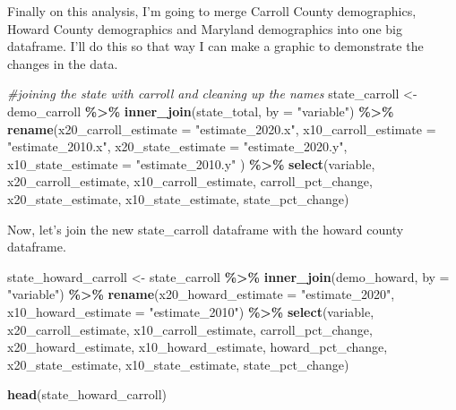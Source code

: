 \documentclass[
]{article}
\newenvironment{Shaded}{\begin{snugshade}}{\end{snugshade}}
\newcommand{\AttributeTok}[1]{\textcolor[rgb]{0.13,0.29,0.53}{#1}}
\newcommand{\CommentTok}[1]{\textcolor[rgb]{0.56,0.35,0.01}{\textit{#1}}}
\newcommand{\FunctionTok}[1]{\textcolor[rgb]{0.13,0.29,0.53}{\textbf{#1}}}
\newcommand{\NormalTok}[1]{#1}
\newcommand{\OtherTok}[1]{\textcolor[rgb]{0.56,0.35,0.01}{#1}}
\newcommand{\SpecialCharTok}[1]{\textcolor[rgb]{0.81,0.36,0.00}{\textbf{#1}}}
\newcommand{\StringTok}[1]{\textcolor[rgb]{0.31,0.60,0.02}{#1}}
\begin{document}
Finally on this analysis, I'm going to merge Carroll County
demographics, Howard County demographics and Maryland demographics into
one big dataframe. I'll do this so that way I can make a graphic to
demonstrate the changes in the data.

\begin{Shaded}
\begin{Highlighting}[]
\CommentTok{\#joining the state with carroll and cleaning up the names}
\NormalTok{state\_carroll }\OtherTok{\textless{}{-}}\NormalTok{ demo\_carroll }\SpecialCharTok{\%\textgreater{}\%} 
  \FunctionTok{inner\_join}\NormalTok{(state\_total, }\AttributeTok{by =} \StringTok{"variable"}\NormalTok{) }\SpecialCharTok{\%\textgreater{}\%} 
  \FunctionTok{rename}\NormalTok{(}\AttributeTok{x20\_carroll\_estimate =} \StringTok{"estimate\_2020.x"}\NormalTok{,}
         \AttributeTok{x10\_carroll\_estimate =} \StringTok{"estimate\_2010.x"}\NormalTok{,}
         \AttributeTok{x20\_state\_estimate =} \StringTok{"estimate\_2020.y"}\NormalTok{,}
         \AttributeTok{x10\_state\_estimate =} \StringTok{"estimate\_2010.y"}
\NormalTok{         ) }\SpecialCharTok{\%\textgreater{}\%} 
  \FunctionTok{select}\NormalTok{(variable, x20\_carroll\_estimate, x10\_carroll\_estimate, carroll\_pct\_change, x20\_state\_estimate, x10\_state\_estimate, state\_pct\_change)}
\end{Highlighting}
\end{Shaded}

Now, let's join the new state\_carroll dataframe with the howard county
dataframe.

\begin{Shaded}
\begin{Highlighting}[]
\NormalTok{state\_howard\_carroll }\OtherTok{\textless{}{-}}\NormalTok{ state\_carroll }\SpecialCharTok{\%\textgreater{}\%} 
  \FunctionTok{inner\_join}\NormalTok{(demo\_howard, }\AttributeTok{by =} \StringTok{"variable"}\NormalTok{) }\SpecialCharTok{\%\textgreater{}\%} 
  \FunctionTok{rename}\NormalTok{(}\AttributeTok{x20\_howard\_estimate =} \StringTok{"estimate\_2020"}\NormalTok{,}
         \AttributeTok{x10\_howard\_estimate =} \StringTok{"estimate\_2010"}\NormalTok{) }\SpecialCharTok{\%\textgreater{}\%} 
  \FunctionTok{select}\NormalTok{(variable, x20\_carroll\_estimate, x10\_carroll\_estimate, carroll\_pct\_change, x20\_howard\_estimate, x10\_howard\_estimate, howard\_pct\_change, x20\_state\_estimate, x10\_state\_estimate, state\_pct\_change)}

\FunctionTok{head}\NormalTok{(state\_howard\_carroll)}
\end{Highlighting}
\end{Shaded}
\end{document}

